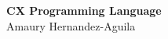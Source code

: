\documentclass[11pt,fleqn,openany]{book} %
\begin{document}

\begingroup
\thispagestyle{empty}
\centering
\vspace*{5cm}
\par\normalfont\fontsize{35}{35}\sffamily\selectfont
\textbf{CX Programming Language}\\
\vspace*{1cm}
{\Huge Amaury Hernandez-Aguila}\par %
\endgroup


\newpage
~\vfill
\thispagestyle{empty}


\noindent \textsc{}\\

\noindent \textsc{}\\ %

\noindent \textit{} %



\pagestyle{empty} %

\tableofcontents %


\pagestyle{fancy} %

\end{document}

